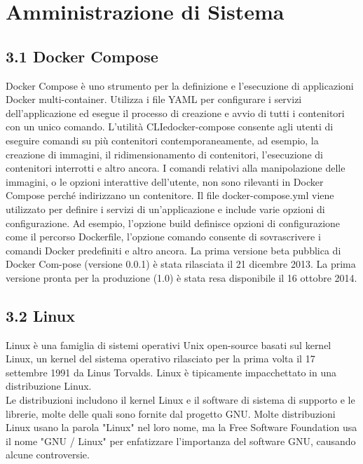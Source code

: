 \chapter{Amministrazione di Sistema}

\section*{3.1 \hspace{1cm} Docker Compose}
Docker Compose è uno strumento per la definizione e l'esecuzione di applicazioni Docker multi-container. Utilizza i file YAML per configurare i servizi dell'applicazione ed esegue il processo di creazione e avvio di tutti i contenitori con un unico comando. L'utilità CLIedocker-compose consente agli utenti di eseguire comandi su più contenitori contemporaneamente, ad esempio, la creazione di immagini, il ridimensionamento di contenitori, l'esecuzione di contenitori interrotti e altro ancora. I comandi relativi alla manipolazione delle immagini, o le opzioni interattive dell'utente, non sono rilevanti in Docker Compose perché indirizzano un contenitore. Il file docker-compose.yml viene utilizzato per definire i servizi di un'applicazione e include varie opzioni di configurazione. Ad esempio, l'opzione build definisce opzioni di configurazione come il percorso Dockerfile, l'opzione comando consente di sovrascrivere i comandi Docker predefiniti e altro ancora. La prima versione beta pubblica di Docker Com-pose (versione 0.0.1) è stata rilasciata il 21 dicembre 2013. La prima versione pronta per la produzione (1.0) è stata resa disponibile il 16 ottobre 2014.
\section*{3.2 \hspace{1cm} Linux}
Linux è una famiglia di sistemi operativi Unix open-source basati sul kernel Linux, un kernel del sistema operativo rilasciato per la prima volta il 17 settembre 1991 da Linus Torvalds. Linux è tipicamente impacchettato in una distribuzione Linux. \\

Le distribuzioni includono il kernel Linux e il software di sistema di supporto e le librerie, molte delle quali sono fornite dal progetto GNU. Molte distribuzioni Linux usano la parola "Linux" nel loro nome, ma la Free Software Foundation usa il nome "GNU / Linux" per enfatizzare l'importanza del software GNU, causando alcune controversie.

